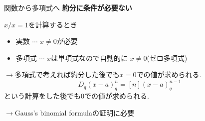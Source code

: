 \documentclass[dvipdfmx,cjk]{beamer}
\theoremstyle{mystyle}
\newcommand{\0}{\textbf{0}}
\begin{document}
%

\begin{frame}{関数から多項式へ} \pause
	\textbf{約分に条件が必要ない} \pause
	
	$x / x = 1$を計算するとき
	\begin{itemize}
		\item 実数 $\cdots$ $x \ne 0$が必要 \pause
		\item 多項式 $\cdots$ $x$は単項式なので自動的に $x \ne 0$(ゼロ多項式) \pause
	\end{itemize}
	$\to$多項式で考えれば約分した後でも$x = 0$での値が求められる. \pause
	\[
	  D_q (x - a)^n_q = [n](x - a)^{n - 1}_q
	\]
	という計算をした後でも$0$での値が求められる. \pause
	
	$\to$Gauss's binomial formulaの証明に必要
\end{frame}

%	

%
%	
\end{document}
